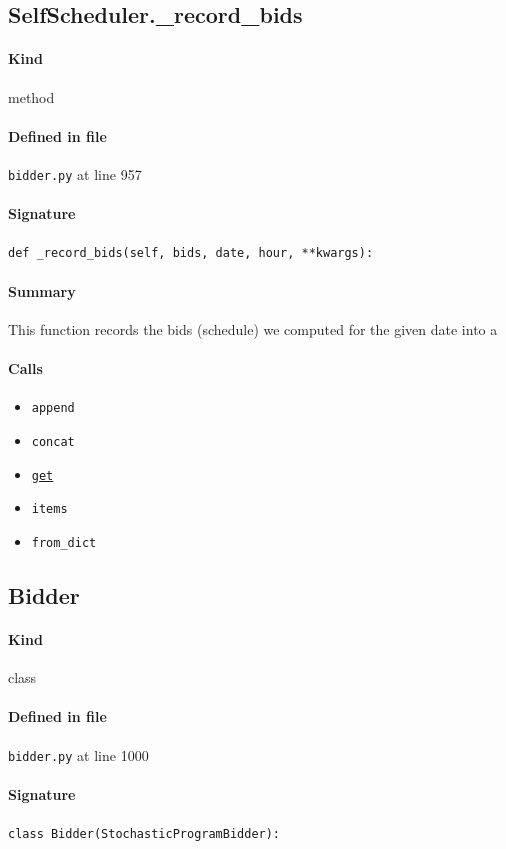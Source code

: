 \documentclass[11pt]{report}
\begin{document}
\subsection{SelfScheduler.\_record\_bids}
\label{def:bidder.py:SelfScheduler._record_bids:L957}
\paragraph{Kind} method
\paragraph{Defined in file} \texttt{bidder.py} at line 957
\paragraph{Signature} \texttt{def \_record\_bids(self, bids, date, hour, **kwargs):}
\paragraph{Summary} This function records the bids (schedule) we computed for the given date into a
\paragraph{Calls}
\begin{itemize}[leftmargin=*]
  \item \texttt{append}
  \item \texttt{concat}
  \item \hyperref[def:tests-test_backcaster.py:DAPrices.get:L294]{\texttt{get}}
  \item \texttt{items}
  \item \texttt{from\_dict}
\end{itemize}
\subsection{Bidder}
\label{def:bidder.py:Bidder:L1000}
\paragraph{Kind} class
\paragraph{Defined in file} \texttt{bidder.py} at line 1000
\paragraph{Signature} \texttt{class Bidder(StochasticProgramBidder):}
\end{document}

